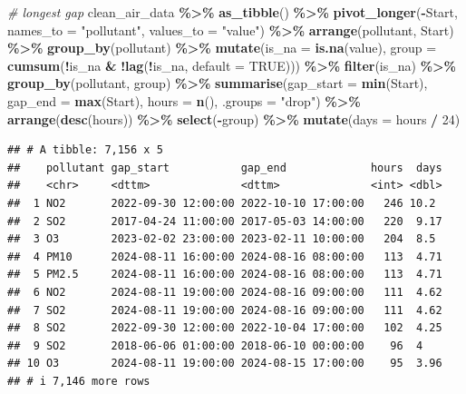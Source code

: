 \documentclass[
]{article}
\newenvironment{Shaded}{\begin{snugshade}}{\end{snugshade}}
\newcommand{\AttributeTok}[1]{\textcolor[rgb]{0.13,0.29,0.53}{#1}}
\newcommand{\CommentTok}[1]{\textcolor[rgb]{0.56,0.35,0.01}{\textit{#1}}}
\newcommand{\ConstantTok}[1]{\textcolor[rgb]{0.56,0.35,0.01}{#1}}
\newcommand{\DecValTok}[1]{\textcolor[rgb]{0.00,0.00,0.81}{#1}}
\newcommand{\FunctionTok}[1]{\textcolor[rgb]{0.13,0.29,0.53}{\textbf{#1}}}
\newcommand{\NormalTok}[1]{#1}
\newcommand{\SpecialCharTok}[1]{\textcolor[rgb]{0.81,0.36,0.00}{\textbf{#1}}}
\newcommand{\StringTok}[1]{\textcolor[rgb]{0.31,0.60,0.02}{#1}}
\begin{document}
\begin{Shaded}
\begin{Highlighting}[]
\CommentTok{\# longest gap}
\NormalTok{clean\_air\_data }\SpecialCharTok{\%\textgreater{}\%}
  \FunctionTok{as\_tibble}\NormalTok{() }\SpecialCharTok{\%\textgreater{}\%}
  \FunctionTok{pivot\_longer}\NormalTok{(}\SpecialCharTok{{-}}\NormalTok{Start, }\AttributeTok{names\_to =} \StringTok{"pollutant"}\NormalTok{, }\AttributeTok{values\_to =} \StringTok{"value"}\NormalTok{) }\SpecialCharTok{\%\textgreater{}\%}
  \FunctionTok{arrange}\NormalTok{(pollutant, Start) }\SpecialCharTok{\%\textgreater{}\%}
  \FunctionTok{group\_by}\NormalTok{(pollutant) }\SpecialCharTok{\%\textgreater{}\%}
  \FunctionTok{mutate}\NormalTok{(}\AttributeTok{is\_na =} \FunctionTok{is.na}\NormalTok{(value),}
         \AttributeTok{group =} \FunctionTok{cumsum}\NormalTok{(}\SpecialCharTok{!}\NormalTok{is\_na }\SpecialCharTok{\&} \SpecialCharTok{!}\FunctionTok{lag}\NormalTok{(}\SpecialCharTok{!}\NormalTok{is\_na, }\AttributeTok{default =} \ConstantTok{TRUE}\NormalTok{))) }\SpecialCharTok{\%\textgreater{}\%}
  \FunctionTok{filter}\NormalTok{(is\_na) }\SpecialCharTok{\%\textgreater{}\%}
  \FunctionTok{group\_by}\NormalTok{(pollutant, group) }\SpecialCharTok{\%\textgreater{}\%}
  \FunctionTok{summarise}\NormalTok{(}\AttributeTok{gap\_start =} \FunctionTok{min}\NormalTok{(Start), }\AttributeTok{gap\_end =} \FunctionTok{max}\NormalTok{(Start), }\AttributeTok{hours =} \FunctionTok{n}\NormalTok{(), }\AttributeTok{.groups =} \StringTok{"drop"}\NormalTok{) }\SpecialCharTok{\%\textgreater{}\%}
  \FunctionTok{arrange}\NormalTok{(}\FunctionTok{desc}\NormalTok{(hours)) }\SpecialCharTok{\%\textgreater{}\%}
  \FunctionTok{select}\NormalTok{(}\SpecialCharTok{{-}}\NormalTok{group) }\SpecialCharTok{\%\textgreater{}\%}
  \FunctionTok{mutate}\NormalTok{(}\AttributeTok{days =}\NormalTok{ hours }\SpecialCharTok{/} \DecValTok{24}\NormalTok{)}
\end{Highlighting}
\end{Shaded}

\begin{verbatim}
## # A tibble: 7,156 x 5
##    pollutant gap_start           gap_end             hours  days
##    <chr>     <dttm>              <dttm>              <int> <dbl>
##  1 NO2       2022-09-30 12:00:00 2022-10-10 17:00:00   246 10.2 
##  2 SO2       2017-04-24 11:00:00 2017-05-03 14:00:00   220  9.17
##  3 O3        2023-02-02 23:00:00 2023-02-11 10:00:00   204  8.5 
##  4 PM10      2024-08-11 16:00:00 2024-08-16 08:00:00   113  4.71
##  5 PM2.5     2024-08-11 16:00:00 2024-08-16 08:00:00   113  4.71
##  6 NO2       2024-08-11 19:00:00 2024-08-16 09:00:00   111  4.62
##  7 SO2       2024-08-11 19:00:00 2024-08-16 09:00:00   111  4.62
##  8 SO2       2022-09-30 12:00:00 2022-10-04 17:00:00   102  4.25
##  9 SO2       2018-06-06 01:00:00 2018-06-10 00:00:00    96  4   
## 10 O3        2024-08-11 19:00:00 2024-08-15 17:00:00    95  3.96
## # i 7,146 more rows
\end{verbatim}
\end{document}
